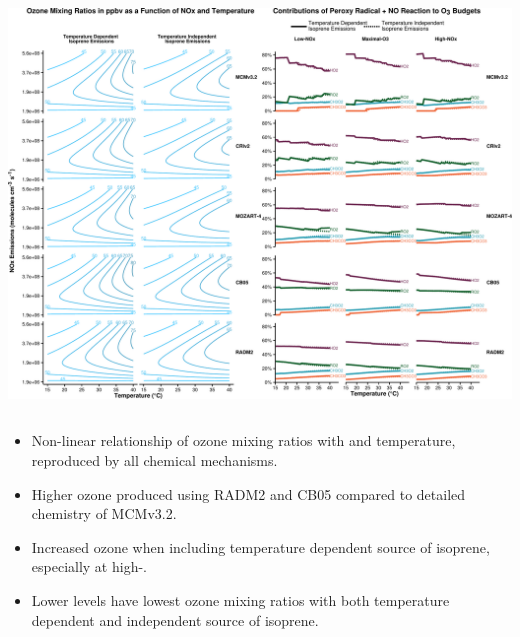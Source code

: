 \begin{GreyBox}
    \vskip-1cm
    \begin{block}{} 
        
        \begin{center}
            \includegraphics[width=\textwidth]{Plotting/results}
        \end{center}
        \begin{columns}[c]
                \begin{WhiteBox}
                    \begin{itemize} \vspace{3mm}
                        \item Non-linear relationship of ozone mixing ratios with  and temperature, reproduced by all chemical mechanisms. \vspace{9mm}
                        \item Higher ozone produced using RADM2 and CB05 compared to detailed chemistry of MCMv3.2. \vspace{9mm}
                        \item Increased ozone when including temperature dependent source of isoprene, especially at high-. \vspace{9mm}
                        \item Lower  levels have lowest ozone mixing ratios with both temperature dependent and independent source of isoprene. \vspace{9mm}

\end{itemize}
\end{WhiteBox}
\end{columns}
\end{block}
\end{GreyBox}
